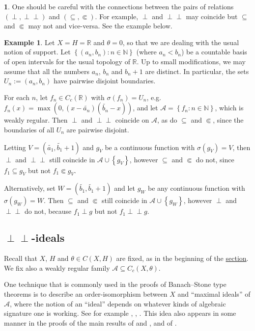 \documentclass[letter,11pt]{amsart}
\theoremstyle{plain}		\newtheorem{theorem}[generalnumbering]{Theorem}
\theoremstyle{plain}		\newtheorem{corollary}[generalnumbering]{Corollary}
\theoremstyle{definition}		\newtheorem{definition}[generalnumbering]{Definition}
\theoremstyle{definition}		\newtheorem{example}[generalnumbering]{Example}
\theoremstyle{plain}		\newtheorem{proposition}[generalnumbering]{Proposition}
\theoremstyle{plain}		\newtheorem{lemma}[generalnumbering]{Lemma}
\newcommand{\namedenvironment}{}
\theoremstyle{definition}
\newtheorem*{theoremfornamed}{\namedenvironment}
\newenvironment{named}[1]{\renewcommand{\namedenvironment}{#1}\begin{theoremfornamed}}{\end{theoremfornamed}}
\newcommand{\perpp}{\perp\!\!\!\perp}
\begin{document}
\begin{named}{Remark}
	One should be careful with the connections between the pairs of relations $(\perp,\perpp)$ and $(\subseteq,\Subset)$. For example, $\perp$ and $\perpp$ may coincide but $\subseteq$ and $\Subset$ may not and vice-versa. See the example below.
\end{named}

\begin{example}
	Let $X=H=\mathbb{R}$ and $\theta=0$, so that we are dealing with the usual notion of support. Let $\left\{(a_n,b_n):n\in\mathbb{N}\right\}$ (where $a_n<b_n$) be a countable basis of open intervals for the usual topology of $\mathbb{R}$. Up to small modifications, we may assume that all the numbers $a_n$, $b_n$ and $b_n+1$ are distinct. In particular, the sets $U_n:=(a_n,b_n)$ have pairwise disjoint boundaries.
	
	For each $n$, let $f_n\in C_c(\mathbb{R})$ with $\sigma(f_n)=U_n$, e.g. $f_n(x)=\max(0,(x-\widetilde{a_n})(\widetilde{b_n}-x))$,
	and let $\mathcal{A}=\left\{f_n:n\in\mathbb{N}\right\}$, which is weakly regular. Then $\perp$ and $\perpp$ coincide on $\mathcal{A}$, as do $\subseteq$ and $\Subset$, since the boundaries of all $U_n$ are pairwise disjoint.
	
	Letting $V=(\widetilde{a_1},\widetilde{b_1}+1)$ and $g_V$ be a continuous function with $\sigma(g_V)=V$, then $\perp$ and $\perpp$ still coincide in $\mathcal{A}\cup\left\{g_V\right\}$, however $\subseteq$ and $\Subset$ do not, since $f_1\subseteq g_V$ but not $f_1\Subset g_V$.
	
	Alternatively, set $W=(\widetilde{b_1},\widetilde{b_1}+1)$ and let $g_W$ be any continuous function with $\sigma(g_W)=W$. Then $\subseteq$ and $\Subset$ still coincide in $\mathcal{A}\cup\left\{g_W\right\}$, however $\perp$ and $\perpp$ do not, because $f_1\perp g$ but not $f_1\perpp g$.
\end{example}

\subsection{\texorpdfstring{$\perpp$}{⊥⊥}-ideals}

Recall that $X$, $H$ and $\theta\in C(X,H)$ are fixed, as in the beginning of the \hyperref[sectiondisjointness]{section}. We fix also a weakly regular family $\mathcal{A}\subseteq C_c(X,\theta)$.

One technique that is commonly used in the proofs of Banach--Stone type theorems is to describe an order-isomorphism between $X$ and ``maximal ideals'' of $\mathcal{A}$, where the notion of an ``ideal'' depends on whatever kinds of algebraic signature one is working. See for example \cite[Lemma 2.2]{MR0029476}, \cite[Proposition 2.7]{MR2324919}, \cite[Lemma 3]{MR0020715}. This idea also appears in some manner in the proofs of the main results of \cite{MR3162258} and \cite{MR1060366}, and of \cite[p. 170, Théorème 3]{MR1357166}.
\end{document}
